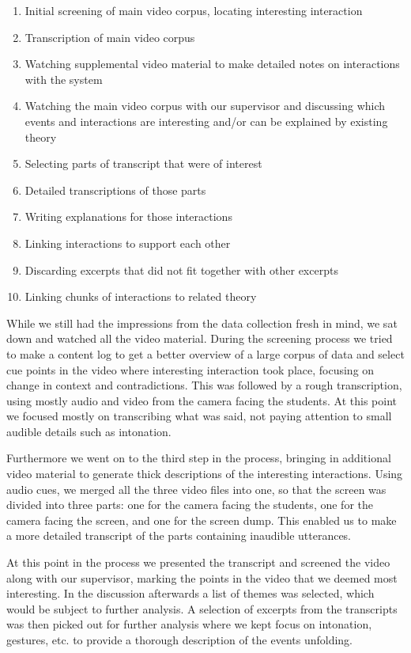\begin{enumerate}
\item{Initial screening of main video corpus, locating interesting interaction}
\item{Transcription of main video corpus}
\item{Watching supplemental video material to make detailed notes on interactions with the system}
\item{Watching the main video corpus with our supervisor and discussing which events and interactions are interesting and/or can be explained by existing theory}
\item{Selecting parts of transcript that were of interest}
\item{Detailed transcriptions of those parts}
\item{Writing explanations for those interactions}
\item{Linking interactions to support each other}
\item{Discarding excerpts that did not fit together with other excerpts}
\item{Linking chunks of interactions to related theory}
\end{enumerate}

While we still had the impressions from the data collection fresh in mind, we sat down and watched all the video material. During the screening process we tried to make a content log to get a better overview of a large corpus of data and select cue points in the video where interesting interaction took place, focusing on change in context and contradictions. This was followed by a rough transcription, using mostly audio and video from the camera facing the students. At this point we focused mostly on transcribing what was said, not paying attention to small audible details such as intonation. 

Furthermore we went on to the third step in the process, bringing in additional video material to generate thick descriptions of the interesting interactions. Using audio cues, we merged all the three video files into one, so that the screen was divided into three parts: one for the camera facing the students, one for the camera facing the screen, and one for the screen dump. This enabled us to make a more detailed transcript of the parts containing inaudible utterances.

At this point in the process we presented the transcript and screened the video along with our supervisor, marking the points in the video that we deemed most interesting. In the discussion afterwards a list of themes was selected, which would be subject to further analysis. A selection of excerpts from the transcripts was then picked out for further analysis where we kept focus on intonation, gestures, etc. to provide a thorough description of the events unfolding. 

